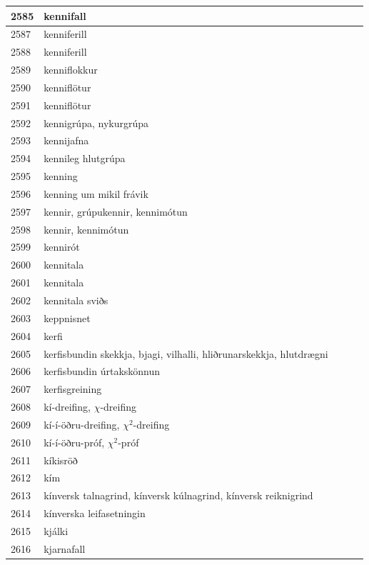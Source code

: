 \begin{longtable}{p{}|p{}|p{}|p{}|p{}}
\hline
2585 & kennifall &  &  &  \\
\hline
2587 & kenniferill &  &  &  \\
\hline
2588 & kenniferill &  &  &  \\
\hline
2589 & kenniflokkur &  &  &  \\
\hline
2590 & kenniflötur &  &  &  \\
\hline
2591 & kenniflötur &  &  &  \\
\hline
2592 & kennigrúpa, nykurgrúpa &  &  &  \\
\hline
2593 & kennijafna &  &  &  \\
\hline
2594 & kennileg hlutgrúpa &  &  &  \\
\hline
2595 & kenning &  &  &  \\
\hline
2596 & kenning um mikil frávik &  &  &  \\
\hline
2597 & kennir, grúpukennir, kennimótun &  &  &  \\
\hline
2598 & kennir, kennimótun &  &  &  \\
\hline
2599 & kennirót &  &  &  \\
\hline
2600 & kennitala &  &  &  \\
\hline
2601 & kennitala &  &  &  \\
\hline
2602 & kennitala sviðs &  &  &  \\
\hline
2603 & keppnisnet &  &  &  \\
\hline
2604 & kerfi &  &  &  \\
\hline
2605 & kerfisbundin skekkja, bjagi, vilhalli, hliðrunarskekkja, hlutdrægni &  &  &  \\
\hline
2606 & kerfisbundin úrtakskönnun &  &  &  \\
\hline
2607 & kerfisgreining &  &  &  \\
\hline
2608 & kí-dreifing, \(\chi\)-dreifing &  &  &  \\
\hline
2609 & kí-í-öðru-dreifing, \(\chi^2\)-dreifing &  &  &  \\
\hline
2610 & kí-í-öðru-próf, \(\chi^2\)-próf &  &  &  \\
\hline
2611 & kíkisröð &  &  &  \\
\hline
2612 & kím &  &  &  \\
\hline
2613 & kínversk talnagrind, kínversk kúlnagrind, kínversk reiknigrind &  &  &  \\
\hline
2614 & kínverska leifasetningin &  &  &  \\
\hline
2615 & kjálki &  &  &  \\
\hline
2616 & kjarnafall &  &  &  \\

\end{longtable}

